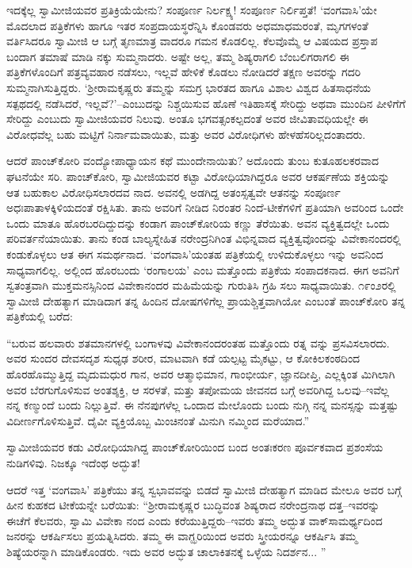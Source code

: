 ಇದಕ್ಕೆಲ್ಲ ಸ್ವಾಮೀಜಿಯವರ ಪ್ರತಿಕ್ರಿಯೆಯೇನು? ಸಂಪೂರ್ಣ ನಿರ್ಲಕ್ಷ್ಯ! ಸಂಪೂರ್ಣ ನಿರ್ಲಿಪ್ತತೆ! ‘ವಂಗವಾಸಿ’ಯೇ ಮೊದಲಾದ ಪತ್ರಿಕೆಗಳು ಹಾಗೂ ಇತರ ಸಂಪ್ರದಾಯಸ್ಥರೆನ್ನಿಸಿ ಕೊಂಡವರು ಅಧಮಾಧಮರಂತೆ, ಮೃಗಗಳಂತೆ ವರ್ತಿಸಿದರೂ ಸ್ವಾಮೀಜಿ ಆ ಬಗ್ಗೆ ತೃಣಮಾತ್ರ ವಾದರೂ ಗಮನ ಕೊಡಲಿಲ್ಲ. ಕೆಲವೊಮ್ಮೆ ಆ ವಿಷಯದ ಪ್ರಸ್ತಾಪ ಬಂದಾಗ ತಮಾಷೆ ಮಾಡಿ ನಕ್ಕು ಸುಮ್ಮನಾದರು. ಅಷ್ಟೇ ಅಲ್ಲ, ತಮ್ಮ ಶಿಷ್ಯರಾಗಲಿ ಬೆಂಬಲಿಗರಾಗಲಿ ಈ ಪತ್ರಿಕೆಗಳೊಂದಿಗೆ ಪತ್ರವ್ಯವಹಾರ ನಡೆಸಲು, ಇಲ್ಲವೆ ಹೇಳಿಕೆ ಕೊಡಲು ನೋಡಿದರೆ ತಕ್ಷಣ ಅವರನ್ನು ಗದರಿ ಸುಮ್ಮನಾಗಿಸುತ್ತಿದ್ದರು. ‘ಶ್ರೀರಾಮಕೃಷ್ಣರು ತಮ್ಮನ್ನು ಸಮಗ್ರ ಭಾರತದ ಹಾಗೂ ವಿಶಾಲ ವಿಶ್ವದ ಹಿತಸಾಧನೆಯ ಸತ್ಪಥದಲ್ಲಿ ನಡೆಸಿದರೆ, ಇಲ್ಲವೆ?’–ಎಂಬುದನ್ನು ನಿಶ್ಚಯಿಸುವ ಹೊಣೆ ಇತಿಹಾಸಕ್ಕೆ ಸೇರಿದ್ದು ಅಥವಾ ಮುಂದಿನ ಪೀಳಿಗೆಗೆ ಸೇರಿದ್ದು ಎಂಬುದು ಸ್ವಾಮೀಜಿಯವರ ನಿಲುವು. ಅಂತೂ ಭಗವತ್ಸಂಕಲ್ಪದಂತೆ ಅವರ ಜೀವಿತಾವಧಿಯಲ್ಲೇ ಈ ವಿರೋಧವೆಲ್ಲ ಬಹು ಮಟ್ಟಿಗೆ ನಿರ್ನಾಮವಾಯಿತು, ಮತ್ತು ಅವರ ವಿರೋಧಿಗಳು ಹೇಳಹೆಸರಿಲ್ಲದಂತಾದರು.

ಆದರೆ ಪಾಂಚ್​ಕೋರಿ ವಂದ್ಯೋಪಾಧ್ಯಾಯನ ಕಥೆ ಮುಂದೇನಾಯಿತು? ಅದೊಂದು ತುಂಬ ಕುತೂಹಲಕರವಾದ ಘಟನೆಯೇ ಸರಿ. ಪಾಂಚ್​ಕೋರಿ, ಸ್ವಾಮೀಜಿಯವರ ಕಟ್ಟಾ ವಿರೋಧಿಯಾಗಿದ್ದರೂ ಅವರ ಆಕರ್ಷಣೆಯ ಶಕ್ತಿಯನ್ನು ಆತ ಬಹುಕಾಲ ವಿರೋಧಿಸಲಾರದವ ನಾದ. ಅವನಲ್ಲಿ ಅಡಗಿದ್ದ ಅತಂಸ್ಸತ್ವವೇ ಆತನನ್ನು ಸಂಪೂರ್ಣ ಅಧಃಪಾತಾಳಕ್ಕಿಳಿಯದಂತೆ ರಕ್ಷಿಸಿತು. ತಾನು ಅವರಿಗೆ ನೀಡಿದ ನಿರಂತರ ನಿಂದೆ-ಟೀಕೆಗಳಿಗೆ ಪ್ರತಿಯಾಗಿ ಅವರಿಂದ ಒಂದೇ ಒಂದು ಮಾತೂ ಹೊರಬರದಿದ್ದುದನ್ನು ಕಂಡಾಗ ಪಾಂಚ್​ಕೋರಿಯ ಕಣ್ಣು ತೆರೆಯಿತು. ಅವನ ವ್ಯಕ್ತಿತ್ವದಲ್ಲೇ ಒಂದು ಪರಿವರ್ತನೆಯಾಯಿತು. ತಾನು ಕಂಡ ಬಾಲ್ಯಸ್ನೇಹಿತ ನರೇಂದ್ರನಿಗಿಂತ ವಿಭಿನ್ನವಾದ ವ್ಯಕ್ತಿತ್ವವೊಂದನ್ನು ವಿವೇಕಾನಂದರಲ್ಲಿ ಕಂಡುಕೊಳ್ಳಲು ಆತ ಈಗ ಸಮರ್ಥನಾದ. ‘ವಂಗವಾಸಿ’ಯಂತಹ ಪತ್ರಿಕೆಯಲ್ಲಿ ಉಳಿದುಕೊಳ್ಳಲು ಇನ್ನು ಅವನಿಂದ ಸಾಧ್ಯವಾಗಲಿಲ್ಲ. ಅಲ್ಲಿಂದ ಹೊರಬಂದು ‘ರಂಗಾಲಯ’ ಎಂಬ ಮತ್ತೊಂದು ಪತ್ರಿಕೆಯ ಸಂಪಾದಕನಾದ. ಈಗ ಅವನಿಗೆ ಸ್ವತಂತ್ರವಾಗಿ ಮುಕ್ತಮನಸ್ಸಿನಿಂದ ವಿವೇಕಾನಂದರ ಮಹಿಮೆಯನ್ನು ಗುರುತಿಸಿ ಗ್ರಹಿ ಸಲು ಸಾಧ್ಯವಾಯಿತು. ೧೯ಂ೨ರಲ್ಲಿ ಸ್ವಾಮೀಜಿ ದೇಹತ್ಯಾಗ ಮಾಡಿದಾಗ ತನ್ನ ಹಿಂದಿನ ದೋಷಗಳಿಗೆಲ್ಲ ಪ್ರಾಯಶ್ಚಿತ್ತವಾಗಿಯೋ ಎಂಬಂತೆ ಪಾಂಚ್​ಕೋರಿ ತನ್ನ ಪತ್ರಿಕೆಯಲ್ಲಿ ಬರೆದ:

“ಬರುವ ಹಲವಾರು ಶತಮಾನಗಳಲ್ಲಿ ಬಂಗಾಳವು ವಿವೇಕಾನಂದರಂತಹ ಮತ್ತೊಂದು ರತ್ನ ವನ್ನು ಪ್ರಸವಿಸಲಾರದು. ಅವರ ಸುಂದರ ದೇವಸದೃಶ ಸುಧೃಢ ಶರೀರ, ಮಾಟವಾಗಿ ಕಡೆ ಯಲ್ಪಟ್ಟ ಮೈಕಟ್ಟು, ಆ ಕೋಕಿಲಕಂಠದಿಂದ ಹೊರಹೊಮ್ಮುತ್ತಿದ್ದ ಮೃದುಮಧುರ ಗಾನ, ಅವರ ಆತ್ಮಾಭಿಮಾನ, ಗಾಂಭೀರ್ಯ, ಜ್ಞಾನದೀಪ್ತಿ, ಎಲ್ಲಕ್ಕಿಂತ ಮಿಗಿಲಾಗಿ ಅವರ ಬೆರಗುಗೊಳಿಸುವ ಅಂತಶ್ಶಕ್ತಿ, ಆ ಸರಳತೆ, ಮತ್ತು ತಪೋಮಯ ಜೀವನದ ಬಗ್ಗೆ ಅವರಿಗಿದ್ದ ಒಲವು–ಇವೆಲ್ಲ ನನ್ನ ಕಣ್ಮುಂದೆ ಬಂದು ನಿಲ್ಲುತ್ತಿವೆ. ಈ ನೆನಪುಗಳೆಲ್ಲ ಒಂದಾದ ಮೇಲೊಂದು ಬಂದು ನುಗ್ಗಿ ನನ್ನ ಮನಸ್ಸನ್ನು ಮತ್ತಷ್ಟು ವಿದೀರ್ಣಗೊಳಿಸುತ್ತಿವೆ. ದೈವೀ ವ್ಯಕ್ತಿಯೊಬ್ಬ ಮಿಂಚಿನಂತೆ ಮಿನುಗಿ ನಮ್ಮಿಂದ ಮರೆಯಾದ.”

ಸ್ವಾಮೀಜಿಯವರ ಕಡು ವಿರೋಧಿಯಾಗಿದ್ದ ಪಾಂಚ್​ಕೋರಿಯಿಂದ ಬಂದ ಅಂತಃಕರಣ ಪೂರ್ವಕವಾದ ಪ್ರಶಂಸೆಯ ನುಡಿಗಳಿವು. ನಿಜಕ್ಕೂ ಇದೆಂಥ ಅದ್ಭುತ!

ಆದರೆ ಇತ್ತ ‘ವಂಗವಾಸಿ’ ಪತ್ರಿಕೆಯು ತನ್ನ ಸ್ವಭಾವವನ್ನು ಬಿಡದೆ ಸ್ವಾಮೀಜಿ ದೇಹತ್ಯಾಗ ಮಾಡಿದ ಮೇಲೂ ಅವರ ಬಗ್ಗೆ ಹೀನ ಕುಹಕದ ಟೀಕೆಯನ್ನೇ ಬರೆಯಿತು: “ಶ್ರೀರಾಮಕೃಷ್ಣರ ಬುದ್ಧಿವಂತ ಶಿಷ್ಯರಾದ ನರೇಂದ್ರನಾಥ ದತ್ತ–ಇವರನ್ನು ಈಚೆಗೆ ಕೆಲವರು, ಸ್ವಾಮಿ ವಿವೇಕಾ ನಂದ ಎಂದು ಕರೆಯುತ್ತಿದ್ದರು–ಇವರು ತಮ್ಮ ಅದ್ಭುತ ವಾಕ್​ಸಾಮರ್ಥ್ಯದಿಂದ ಜನರನ್ನು ಆಕರ್ಷಿಸಲು ಪ್ರಯತ್ನಿಸಿದರು. ತಮ್ಮ ಈ ವಾಗ್ಝರಿಯಿಂದ ಅವರು ಸ್ತ್ರೀಯರನ್ನೂ ಆಕರ್ಷಿಸಿ ತಮ್ಮ ಶಿಷ್ಯೆಯರನ್ನಾಗಿ ಮಾಡಿಕೊಂಡರು. ಇದು ಅವರ ಅದ್ಭುತ ಚಾಲಾಕಿತನಕ್ಕೆ ಒಳ್ಳೆಯ ನಿದರ್ಶನ... ”

